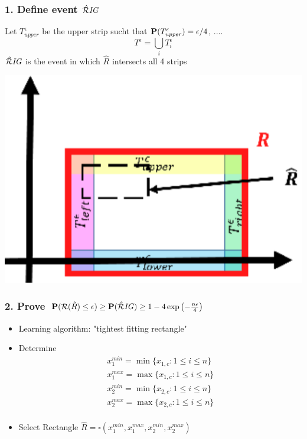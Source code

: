 \subsubsection*{1. Define event $\RIG$} 
\begin{minipage}{0.5\columnwidth}
	Let $T_{\mathit{upper}}^\epsilon$ be the upper strip sucht that $\P(T_{\mathit{upper}}^\epsilon) = \epsilon/4$, ....\\
	$$
		T^\epsilon = \bigcup_i T_i^\epsilon
	$$
	$\RIG$ is the event in which $\hat R$ intersects all 4 strips
\end{minipage}
\begin{minipage}{0.4\columnwidth}
	\begin{center}
		\includegraphics[width=\columnwidth]{images/13-rig}
	\end{center}
\end{minipage}

\subsubsection*{2. Prove $\P(\mathcal R(\hat R)\leq \epsilon) \geq \P(\RIG)\geq 1 - 4\exp\left(-\frac{n\epsilon}{4}\right)$}
\begin{itemize}
	\item Learning algorithm: "tightest fitting rectangle"
	\item Determine
	\begin{align*}
		x_1^{min} = \min\{x_{1,c}:1\leq i\leq n\} \\
		x_1^{max} = \max\{x_{1,c}:1\leq i\leq n\} \\
		x_2^{min} = \min\{x_{2,c}:1\leq i\leq n\} \\
		x_2^{max} = \max\{x_{2,c}:1\leq i\leq n\} \\
	\end{align*}
	\item Select Rectangle $\hat R = \square(x_1^{min}, x_1^{max}, x_2^{min}, x_2^{max})$
\end{itemize}

